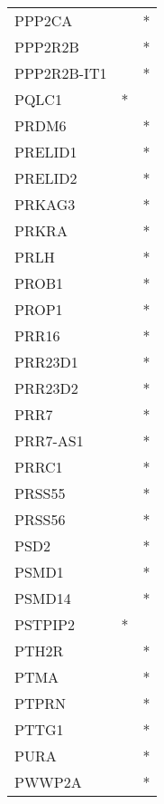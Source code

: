 \begin{longtable}{lcc}
PPP2CA          &                &          * \\
PPP2R2B         &                &          * \\
PPP2R2B-IT1     &                &          * \\
PQLC1           &              * &            \\
PRDM6           &                &          * \\
PRELID1         &                &          * \\
PRELID2         &                &          * \\
PRKAG3          &                &          * \\
PRKRA           &                &          * \\
PRLH            &                &          * \\
PROB1           &                &          * \\
PROP1           &                &          * \\
PRR16           &                &          * \\
PRR23D1         &                &          * \\
PRR23D2         &                &          * \\
PRR7            &                &          * \\
PRR7-AS1        &                &          * \\
PRRC1           &                &          * \\
PRSS55          &                &          * \\
PRSS56          &                &          * \\
PSD2            &                &          * \\
PSMD1           &                &          * \\
PSMD14          &                &          * \\
PSTPIP2         &              * &            \\
PTH2R           &                &          * \\
PTMA            &                &          * \\
PTPRN           &                &          * \\
PTTG1           &                &          * \\
PURA            &                &          * \\
PWWP2A          &                &          * \\

\end{longtable}
